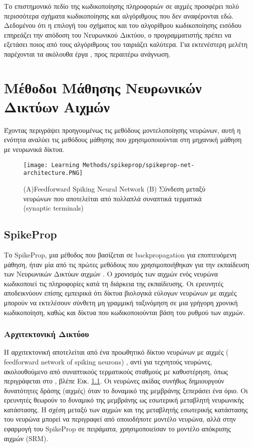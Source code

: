 \documentclass[12pt]{report}
\begin{document}
Το επιστημονικό πεδίο της κωδικοποίησης πληροφοριών σε αιχμές προσφέρει πολύ περισσότερα σχήματα κωδικοποίησης και αλγόριθμους που δεν αναφέρονται εδώ. Δεδομένου ότι η επιλογή του σχήματος και του αλγορίθμου κωδικοποίησης εισόδου επηρεάζει την απόδοση του Νευρωνικού Δικτύου, ο προγραμματιστής πρέπει να εξετάσει ποιος από τους αλγόριθμους του ταιριάζει καλύτερα. Για εκτενέστερη μελέτη παρέχονται τα ακόλουθα έργα \cite{Guo2021}, \cite{Schuman2019} προς περαιτέρω ανάγνωση.

\chapter{Μέθοδοι Μάθησης Νευρωνικών Δικτύων Αιχμών}
Έχοντας περιγράψει προηγουμένως τις μεθόδους μοντελοποίησης νευρώνων, αυτή η ενότητα αναλύει τις μεθόδους μάθησης που χρησιμοποιούνται στη μηχανική μάθηση με νευρωνικά δίκτυα.
\begin{figure}[htp]
    \centering
    \texttt{[image: Learning Methods/spikeprop/spikeprop-net-architecture.PNG]}
    \caption{(A)\textlatin{Feedforward Spiking Neural Network}  (B) Σύνδεση μεταξύ νευρώνων που αποτελείται από πολλαπλά συναπτικά τερματικά (\textlatin{synaptic terminals})}
    \label{fig:spikeprop-net-architecture}
\end{figure}
\section{\textlatin{SpikeProp}}

Το \textlatin{SpikeProp}, μια μέθοδος που βασίζεται σε \textlatin{backpropagation} για εποπτευόμενη μάθηση, ήταν μία από τις πρώτες μεθόδους που χρησιμοποιήθηκαν για την εκπαίδευση των Νευρωνικών Δικτύων αιχμών \cite{Bohte2002}. Ο χρονισμός των αιχμών ενός νευρώνα κωδικοποιεί τις πληροφορίες κατά τη διάρκεια της εκπαίδευσης. Οι ερευνητές αποδεικνύουν επίσης εμπειρικά ότι δίκτυα βιολογικά εύλογων νευρώνων με αιχμές μπορούν να εκτελέσουν σύνθετη μη γραμμική ταξινόμηση σε μια γρήγορη χρονική κωδικοποίηση, καθώς και δίκτυα που κωδικοποιούνται βάση του ρυθμού των αιχμών.
\subsection{Αρχιτεκτονική Δικτύου}
Η αρχιτεκτονική αποτελείται από ένα προωθητικό δίκτυο νευρώνων με αιχμές (\textlatin{ feedforward network of spiking neurons}) , αντί για τεχνητούς νευρώνες, ακολουθούμενο από συναπτικούς τερματικούς σταθμούς με καθυστέρηση, όπως περιγράφεται στο \cite{ruf1998}, βλέπε Εικ. \ref{fig:spikeprop-net-architecture}. Οι νευρώνες ακίδας συνήθως δημιουργούν δυνατότητες δράσης (αιχμές) όταν το δυναμικό της μεμβράνης ξεπεράσει ένα όριο. Οι ερευνητές θεωρούν το δυναμικό της μεμβράνης ως εσωτερική μεταβλητή νευρωνικής κατάστασης. Η σχέση μεταξύ των αιχμών και της μεταβλητής εσωτερικής κατάστασης του νευρώνα μπορεί να περιγραφεί από οποιοδήποτε μοντέλο νευρώνα, αλλά στην εφαρμογή του \textlatin{SpikeProp} σε πειράματα, χρησιμοποιείσαν το μοντέλο απόκρισης αιχμών (\textlatin{SRM}).
\end{document}
